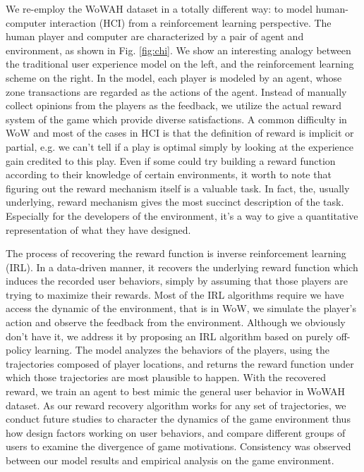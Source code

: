 \documentclass{sigchi}
\begin{document}
We re-employ the WoWAH dataset in a totally different way: to model human-computer interaction (HCI) from a reinforcement learning perspective. 
The human player and computer are characterized by a pair of agent and environment, as shown in Fig. \ref{fig:chi}. 
We show an interesting analogy between the traditional user experience model on the left, and the reinforcement learning scheme on the right. 
In the model, each player is modeled by an agent, whose zone transactions are regarded as the actions of the agent. 
Instead of manually collect opinions from the players as the feedback, we utilize the actual reward system of the game which provide diverse satisfactions.
A common difficulty in WoW and most of the cases in HCI is that the definition of reward is implicit or partial, e.g. we can't tell if a play is optimal simply by looking at the experience gain credited to this play. 
Even if some could try building a reward function according to their knowledge of certain environments, it worth to note that figuring out the reward mechanism itself is a valuable task. 
In fact, the, usually underlying, reward mechanism gives the most succinct description of the task. 
Especially for the developers of the environment, it's a way to give a quantitative representation of what they have designed.



The process of recovering the reward function is inverse reinforcement learning (IRL). 
In a data-driven manner, it recovers the underlying reward function which induces the recorded user behaviors, simply by assuming that those players are trying to maximize their rewards. 
Most of the IRL algorithms require we have access the dynamic of the environment, that is in WoW, we simulate the player's action and observe the feedback from the environment. 
Although we obviously don't have it, we address it by proposing an IRL algorithm based on purely off-policy learning. 
The model analyzes the behaviors of the players, using the trajectories composed of player locations, and returns the reward function under which those trajectories are most plausible to happen. 
With the recovered reward, we train an agent to best mimic the general user behavior in WoWAH dataset. 
As our reward recovery algorithm works for any set of trajectories, we conduct future studies to character the dynamics of the game environment thus how design factors working on user behaviors, and compare different groups of users to examine the divergence of game motivations.
Consistency was observed between our model results and empirical analysis on the game environment. 
\end{document}
